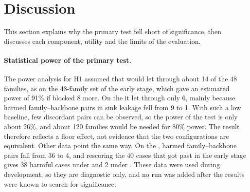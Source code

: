 \section{Discussion}\label{sec:discussion}

This section explains why the primary test fell short of significance, then discusses each component, utility and the
limits of the evaluation.

\paragraph{Statistical power of the primary test.} The power analysis for H1 assumed that \strSand{} would let through
about 14 of the 48 families, as on the 48-family set of the early stage, which gave an estimated power of 91\% if
\ours{} blocked 8 more. On the \test{} it let through only 6, mainly because harmed family--backbone pairs in sink
leakage fell from 9 to 1. With such a low baseline, few discordant pairs can be observed, so the power of the test is
only about 26\%, and about 120 families would be needed for 80\% power. The result therefore reflects a floor effect,
not evidence that the two configurations are equivalent. Other data point the same way. On the \dev, harmed
family--backbone pairs fall from 36 to 4, and rescoring the 40 cases that got past \strSand{} in the early stage gives
38 harmful cases under \strSand{} and 2 under \ours. These data were used during development, so they are diagnostic
only, and no run was added after the results were known to search for significance.

